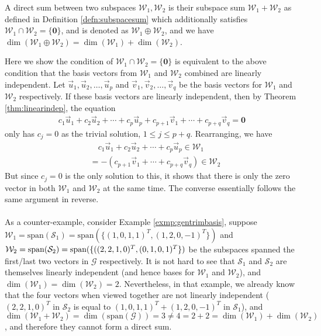 \begin{defn}
\label{defn:directsum}
A direct sum between two subspaces $\mathcal{W}_1, \mathcal{W}_2$ is their subspace sum $\mathcal{W}_1 + \mathcal{W}_2$ as defined in Definition \ref{defn:subspacesum} which additionally satisfies $\mathcal{W}_1 \cap \mathcal{W}_2 = \{\textbf{0}\}$, and is denoted as $\mathcal{W}_1 \oplus \mathcal{W}_2$, and we have $\dim(\mathcal{W}_1 \oplus \mathcal{W}_2) = \dim(\mathcal{W}_1) + \dim(\mathcal{W}_2)$.
\end{defn}
Here we show the condition of $\mathcal{W}_1 \cap \mathcal{W}_2 = \{\textbf{0}\}$ is equivalent to the above condition that the basis vectors from $\mathcal{W}_1$ and $\mathcal{W}_2$ combined are linearly independent. Let $\vec{u}_1, \vec{u}_2, \ldots, \vec{u}_p$ and $\vec{v}_1, \vec{v}_2, \ldots, \vec{v}_q$ be the basis vectors for $\mathcal{W}_1$ and $\mathcal{W}_2$ respectively. If these basis vectors are linearly independent, then by Theorem \ref{thm:linearindep}, the equation
\begin{align*}
c_1\vec{u}_1 + c_2\vec{u}_2 + \cdots + c_p\vec{u}_p + c_{p+1}\vec{v}_1 + \cdots + c_{p+q}\vec{v}_q = \textbf{0}
\end{align*}
only has $c_j = 0$ as the trivial solution, $1 \leq j \leq p+q$. Rearranging, we have
\begin{align*}
&\quad c_1\vec{u}_1 + c_2\vec{u}_2 + \cdots + c_p\vec{u}_p \in \mathcal{W}_1 \\
&= -(c_{p+1}\vec{v}_1 + \cdots + c_{p+q}\vec{v}_q) \in \mathcal{W}_2
\end{align*}
But since $c_j = 0$ is the only solution to this, it shows that there is only the zero vector in both $\mathcal{W}_1$ and $\mathcal{W}_2$ at the same time. The converse essentially follows the same argument in reverse.\\
\\
As a counter-example, consider Example \ref{exmp:gentrimbasis}, suppose $\mathcal{W}_1 = \text{span}(\mathcal{S}_1) = \text{span}(\{(1,0,1,1)^T, (1,2,0,-1)^T\})$ and $\mathcal{W}_2 = \text{span}(\mathcal{S}_2) = \text{span}(\{((2,2,1,0)^T, \\ (0,1,0,1)^T\})$ be the subspaces spanned the first/last two vectors in $\mathcal{G}$ respectively. It is not hard to see that $\mathcal{S}_1$ and $\mathcal{S}_2$ are themselves linearly independent (and hence bases for $\mathcal{W}_1$ and $\mathcal{W}_2$), and $\dim(\mathcal{W}_1) = \dim(\mathcal{W}_2) = 2$. Nevertheless, in that example, we already know that the four vectors when viewed together are not linearly independent ($(2,2,1,0)^T$ in $\mathcal{S}_2$ is equal to $(1,0,1,1)^T + (1,2,0,-1)^T$ in $\mathcal{S}_1$), and $\dim(\mathcal{W}_1 + \mathcal{W}_2) = \dim(\text{span}(\mathcal{G})) = 3 \neq 4 = 2+2 = \dim(\mathcal{W}_1) + \dim(\mathcal{W}_2)$, and therefore they cannot form a direct sum.\\
